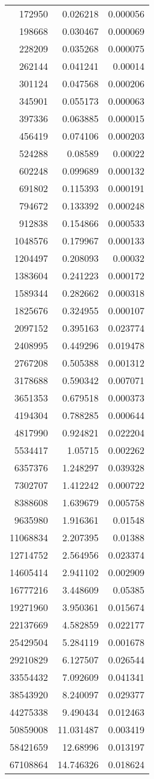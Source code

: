 \begin{longtable}{r r r}
172950 & 0.026218 & 0.000056 \\
198668 & 0.030467 & 0.000069 \\
228209 & 0.035268 & 0.000075 \\
262144 & 0.041241 & 0.00014 \\
301124 & 0.047568 & 0.000206 \\
345901 & 0.055173 & 0.000063 \\
397336 & 0.063885 & 0.000015 \\
456419 & 0.074106 & 0.000203 \\
524288 & 0.08589 & 0.00022 \\
602248 & 0.099689 & 0.000132 \\
691802 & 0.115393 & 0.000191 \\
794672 & 0.133392 & 0.000248 \\
912838 & 0.154866 & 0.000533 \\
1048576 & 0.179967 & 0.000133 \\
1204497 & 0.208093 & 0.00032 \\
1383604 & 0.241223 & 0.000172 \\
1589344 & 0.282662 & 0.000318 \\
1825676 & 0.324955 & 0.000107 \\
2097152 & 0.395163 & 0.023774 \\
2408995 & 0.449296 & 0.019478 \\
2767208 & 0.505388 & 0.001312 \\
3178688 & 0.590342 & 0.007071 \\
3651353 & 0.679518 & 0.000373 \\
4194304 & 0.788285 & 0.000644 \\
4817990 & 0.924821 & 0.022204 \\
5534417 & 1.05715 & 0.002262 \\
6357376 & 1.248297 & 0.039328 \\
7302707 & 1.412242 & 0.000722 \\
8388608 & 1.639679 & 0.005758 \\
9635980 & 1.916361 & 0.01548 \\
11068834 & 2.207395 & 0.01388 \\
12714752 & 2.564956 & 0.023374 \\
14605414 & 2.941102 & 0.002909 \\
16777216 & 3.448609 & 0.05385 \\
19271960 & 3.950361 & 0.015674 \\
22137669 & 4.582859 & 0.022177 \\
25429504 & 5.284119 & 0.001678 \\
29210829 & 6.127507 & 0.026544 \\
33554432 & 7.092609 & 0.041341 \\
38543920 & 8.240097 & 0.029377 \\
44275338 & 9.490434 & 0.012463 \\
50859008 & 11.031487 & 0.003419 \\
58421659 & 12.68996 & 0.013197 \\
67108864 & 14.746326 & 0.018624 \\
\end{longtable}


